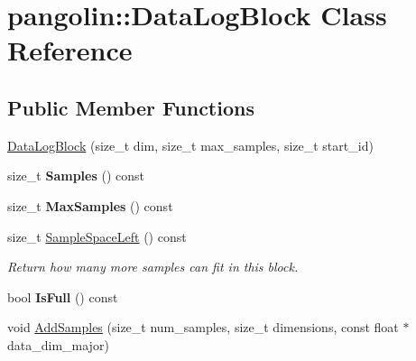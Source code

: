 \hypertarget{classpangolin_1_1_data_log_block}{}\section{pangolin\+:\+:Data\+Log\+Block Class Reference}
\label{classpangolin_1_1_data_log_block}
\subsection*{Public Member Functions}
\begin{DoxyCompactItemize}
\item 
\hyperlink{classpangolin_1_1_data_log_block_aede09d66acd9ec8ce26b17d9a9681358}{Data\+Log\+Block} (size\+\_\+t dim, size\+\_\+t max\+\_\+samples, size\+\_\+t start\+\_\+id)
\item 
size\+\_\+t {\bfseries Samples} () const \hypertarget{classpangolin_1_1_data_log_block_ac81f01afbbe07de9a41059fc5a332b05}{}\label{classpangolin_1_1_data_log_block_ac81f01afbbe07de9a41059fc5a332b05}

\item 
size\+\_\+t {\bfseries Max\+Samples} () const \hypertarget{classpangolin_1_1_data_log_block_a448c0dcf93ba8c6a15ede17482534031}{}\label{classpangolin_1_1_data_log_block_a448c0dcf93ba8c6a15ede17482534031}

\item 
size\+\_\+t \hyperlink{classpangolin_1_1_data_log_block_a9f70cb83e4530154536e2551b498f803}{Sample\+Space\+Left} () const \hypertarget{classpangolin_1_1_data_log_block_a9f70cb83e4530154536e2551b498f803}{}\label{classpangolin_1_1_data_log_block_a9f70cb83e4530154536e2551b498f803}

\begin{DoxyCompactList}\small\item\em Return how many more samples can fit in this block. \end{DoxyCompactList}\item 
bool {\bfseries Is\+Full} () const \hypertarget{classpangolin_1_1_data_log_block_a6be29f2cbd2b85ee41c15a9fc86c4552}{}\label{classpangolin_1_1_data_log_block_a6be29f2cbd2b85ee41c15a9fc86c4552}

\item 
void \hyperlink{classpangolin_1_1_data_log_block_aefa329a9eb3c00bc047d9c01beec02b3}{Add\+Samples} (size\+\_\+t num\+\_\+samples, size\+\_\+t dimensions, const float $\ast$data\+\_\+dim\+\_\+major)\hypertarget{classpangolin_1_1_data_log_block_aefa329a9eb3c00bc047d9c01beec02b3}{}\label{classpangolin_1_1_data_log_block_aefa329a9eb3c00bc047d9c01beec02b3}


\end{DoxyCompactItemize}
